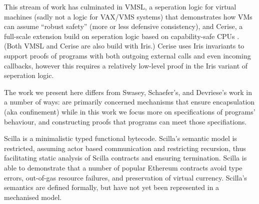 This stream of work has culminated in VMSL, a seperation logic for
virtual machines 
\cite{vmsl-pldi2023}
(sadly not a logic for VAX/VMS systems)
that demonstrates how VMs can assume ``robust safety'' (more or less
defensive consistency), and Cerise, a full-scale extension build on 
seperation logic based on capability-safe CPUs \cite{cerise-jacm2024}.
(Both VMSL and Cerise are also build with Iris.)
Cerise uses Iris invariants to support proofs of programs with both
outgoing external calls and even incoming callbacks,
however this requires a relatively low-level proof in the Iris variant
of seperation logic. 








 
The work we present here differs from Swasey, Schaefer's, and Devriese's work in a number of ways:
 are primarily concerned  %
mechanisms that ensure encapsulation (aka 
confinement)
while
in this work we focus more on specifications of programs' behaviour,
and constructing proofs that programs can meet those specifiations.

Scilla \cite{scillaOOPSLA19} is a minimalistic typed functional
bytecode. Scilla's semantic model is restricted, assuming actor based
communication and restricting recursion,  thus facilitating static
analysis of Scilla contracts and ensuring termination.
Scilla is able to demonstrate that a number of popular Ethereum
contracts avoid type errors, out-of-gas resource failures, and
preservation of virtual currency. 
Scilla's semantics are defined formally, but have not yet been represented in a
mechanised model.

